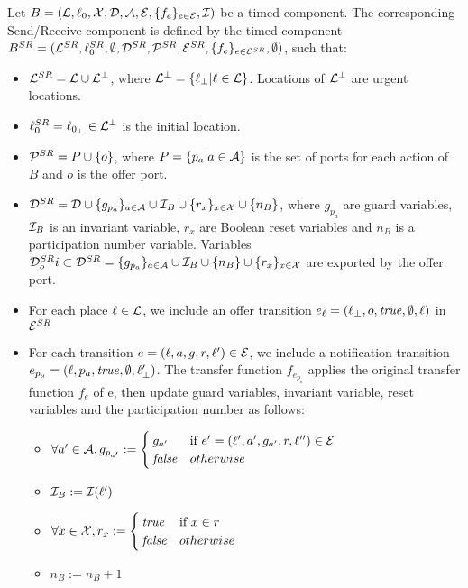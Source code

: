 \begin{definition}\label{def:tc_SR}
  Let $B=(\mathcal{L},\ell_{0},\mathcal{X},\mathcal{D},\mathcal{A},\mathcal{E},\{f_e\}_{e\in\mathcal{E}},\mathcal{I})$ be a timed component. The 
  corresponding Send/Receive component is defined by the timed component
  $B^{SR}=(\mathcal{L}^{SR},\ell_0^{SR},\emptyset,\mathcal{D}^{SR},\mathcal{P}^{SR},\mathcal{E}^{SR},\{f_e\}_{e\in\mathcal{E}^{SR}},
  \emptyset)$, such that:
  \begin{itemize}
    \item $\mathcal{L}^{SR}=\mathcal{L}\cup\mathcal{L}^{\perp}$, where $\mathcal{L}^{\perp}=\{\ell_{\perp}|\ell\in\mathcal{L}\}$.
      Locations of $\mathcal{L}^{\perp}$ are urgent locations.
    \item $\ell_0^{SR}=\ell_{0_{\perp}}\in\mathcal{L}^{\perp}$ is the initial location.
    \item $\mathcal{P}^{SR}= P\cup\{o\}$, where $P=\{p_a|a\in\mathcal{A}\}$ is the set of ports for each
      action of $B$ and $o$ is the offer port. 
    \item $\mathcal{D}^{SR}=\mathcal{D}\cup\{g_{p_a}\}_{a\in\mathcal{A}}\cup\mathcal{I}_{B}\cup\{r_x\}_{x\in\mathcal{X}}
      \cup\{n_B\}$,
      where $g_{p_a}$ are guard variables, $\mathcal{I}_{B}$ is an invariant variable, $r_x$ are 
      Boolean reset variables and $n_B$ is a participation number variable.
      Variables $\mathcal{D}_o^{SR}i\subset\mathcal{D}^{SR}=\{g_{p_a}\}_{a\in\mathcal{A}}\cup\mathcal{I}_{B}\cup
      \{n_B\}\cup\{r_x\}_{x\in\mathcal{X}}$  are exported by the offer port.
    \item For each place $\ell\in\mathcal{L}$, we include an offer transition $e_{\ell}=(\ell_{\perp},o,\textnormal{\textit{true}},
      \emptyset,\ell)$ in $\mathcal{E}^{SR}$
    \item For each transition $e=(\ell,a,g,r,\ell')\in\mathcal{E}$, we include a notification 
      transition $e_{p_a}=(\ell,p_a,\textnormal{\textit{true}},\emptyset,\ell_{\perp}')$. The transfer function $f_{e_{p_a}}$
      applies the original transfer function $f_e$ of e, then update guard variables, 
      invariant variable, reset variables and the participation number as follows:
      \begin{itemize}
        \item $\forall a'\in\mathcal{A}, g_{p_{a'}}:=\begin{cases}
            g_{a'} & \text{if } e'=(\ell',a',g_{a'},r,\ell'')\in\mathcal{E}\\
          \textnormal{\textit{false}} & otherwise
        \end{cases}$
        \item $\mathcal{I}_B:=\mathcal{I}(\ell')$
        \item $\forall x\in\mathcal{X}, r_x:=\begin{cases}
            \textnormal{\textit{true}} & \text{if } x\in r\\
          \textnormal{\textit{false}} & otherwise
        \end{cases}$
        \item $n_B:=n_B+1$
      \end{itemize}
  \end{itemize}
\end{definition}


